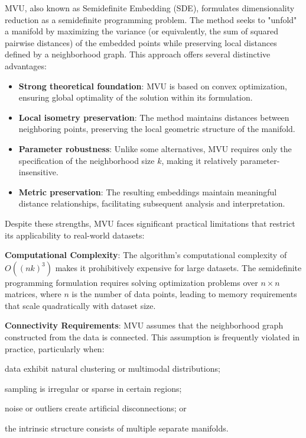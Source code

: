 \ac{MVU}, also known as Semidefinite Embedding (SDE), formulates dimensionality reduction as a semidefinite programming problem. The method seeks to "unfold" a manifold by maximizing the variance (or equivalently, the sum of squared pairwise distances) of the embedded points while preserving local distances defined by a neighborhood graph. This approach offers several distinctive advantages:

\begin{itemize}
    \item \textbf{Strong theoretical foundation}: \ac{MVU} is based on convex optimization, ensuring global optimality of the solution within its formulation.
    \item \textbf{Local isometry preservation}: The method maintains distances between neighboring points, preserving the local geometric structure of the manifold.
    \item \textbf{Parameter robustness}: Unlike some alternatives, \ac{MVU} requires only the specification of the neighborhood size $k$, making it relatively parameter-insensitive.
    \item \textbf{Metric preservation}: The resulting embeddings maintain meaningful distance relationships, facilitating subsequent analysis and interpretation.
\end{itemize}

Despite these strengths, \ac{MVU} faces significant practical limitations that restrict its applicability to real-world datasets:

\textbf{Computational Complexity}: The algorithm's computational complexity of $O((nk)^3)$ \cite{cube} makes it prohibitively expensive for large datasets. The semidefinite programming formulation requires solving optimization problems over $n \times n$ matrices, where $n$ is the number of data points, leading to memory requirements that scale quadratically with dataset size.

\textbf{Connectivity Requirements}: \ac{MVU} assumes that the neighborhood graph constructed from the data is connected. This assumption is frequently violated in practice, particularly when:
\begin{inparaenum}[(i)]
\item data exhibit natural clustering or multimodal distributions;
\item sampling is irregular or sparse in certain regions;
\item noise or outliers create artificial disconnections; or
\item the intrinsic structure consists of multiple separate manifolds.
\end{inparaenum}

